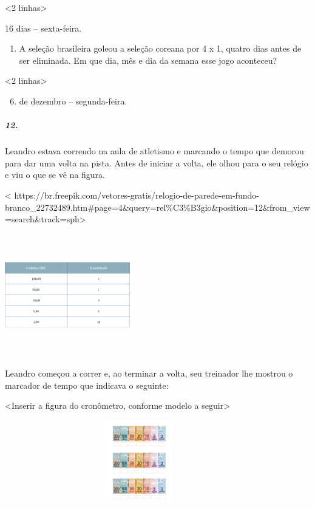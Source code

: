 \textless{}2 linhas\textgreater{}

16 dias -- sexta-feira.

\begin{enumerate}
\def\labelenumi{\alph{enumi})}
\item
  A seleção brasileira goleou a seleção coreana por 4 x 1, quatro dias
  antes de ser eliminada. Em que dia, mês e dia da semana esse jogo
  aconteceu?
\end{enumerate}

\textless{}2 linhas\textgreater{}

\begin{enumerate}
\setcounter{enumi}{5}
\item
  de dezembro -- segunda-feira.
\end{enumerate}

\subparagraph{12.}\label{section-53}

Leandro estava correndo na aula de atletismo e marcando o tempo que
demorou para dar uma volta na pista. Antes de iniciar a volta, ele olhou
para o seu relógio e viu o que se vê na figura.

\textless{}
https://br.freepik.com/vetores-gratis/relogio-de-parede-em-fundo-branco\_22732489.htm\#page=4\&query=rel\%C3\%B3gio\&position=12\&from\_view=search\&track=sph\textgreater{}

\includegraphics[width=2.14583in,height=2.10113in]{media/image66.png}

Leandro começou a correr e, ao terminar a volta, seu treinador lhe
mostrou o marcador de tempo que indicava o seguinte:

\textless{}Inserir a figura do cronômetro, conforme modelo a
seguir\textgreater{}

\includegraphics[width=4.61458in,height=1.43750in]{media/image67.png}

